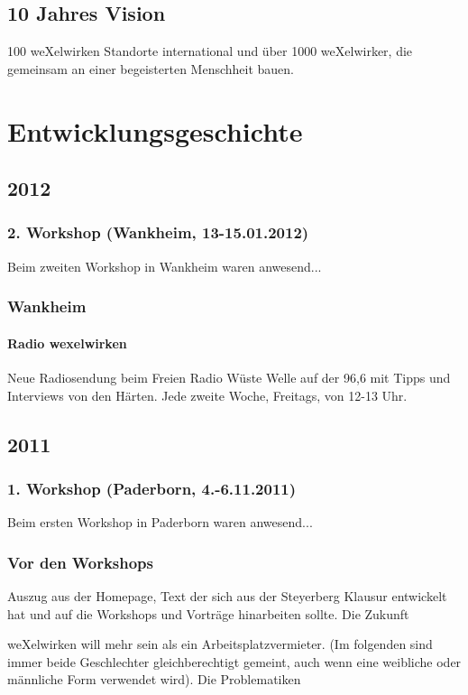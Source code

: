 \begin{appendix}
  \section{10 Jahres Vision}
100 weXelwirken Standorte international und über 1000 weXelwirker, die gemeinsam an einer begeisterten Menschheit bauen.


\chapter{Entwicklungsgeschichte}
  \section{2012}
    \subsection{2. Workshop (Wankheim, 13-15.01.2012)}
Beim zweiten Workshop in Wankheim waren anwesend...
    \subsection{Wankheim}
      \subsubsection{Radio wexelwirken}
Neue Radiosendung beim Freien Radio Wüste Welle auf der 96,6 mit Tipps und Interviews von den Härten. Jede zweite Woche, Freitags, von 12-13 Uhr.
  \section{2011}
    \subsection{1. Workshop (Paderborn, 4.-6.11.2011)}
Beim ersten Workshop in Paderborn waren anwesend...
    \subsection{Vor den Workshops}
Auszug aus der Homepage, Text der sich aus der Steyerberg Klausur entwickelt hat und auf die Workshops und Vorträge hinarbeiten sollte.
\glqq 
Die Zukunft

weXelwirken will mehr sein als ein Arbeitsplatzvermieter. (Im folgenden sind immer beide Geschlechter gleichberechtigt gemeint, auch wenn eine weibliche oder männliche Form verwendet wird).
Die Problematiken


\end{appendix}
